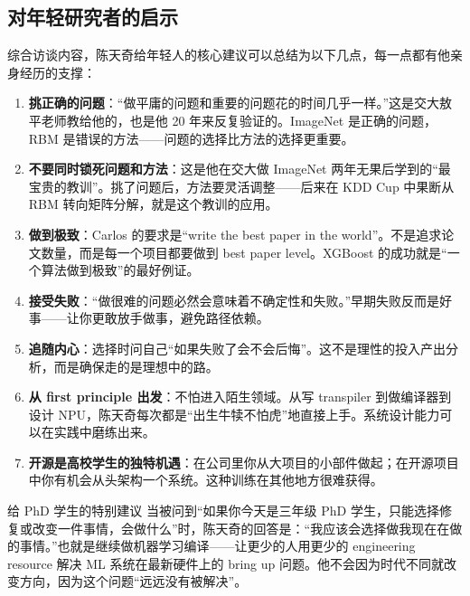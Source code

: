 \documentclass[a4paper]{article}
\begin{document}
\subsection{对年轻研究者的启示}

综合访谈内容，陈天奇给年轻人的核心建议可以总结为以下几点，每一点都有他亲身经历的支撑：

\begin{enumerate}
    \item \textbf{挑正确的问题}：``做平庸的问题和重要的问题花的时间几乎一样。''这是交大敖平老师教给他的，也是他 20 年来反复验证的。ImageNet 是正确的问题，RBM 是错误的方法------问题的选择比方法的选择更重要。

    \item \textbf{不要同时锁死问题和方法}：这是他在交大做 ImageNet 两年无果后学到的``最宝贵的教训''。挑了问题后，方法要灵活调整------后来在 KDD Cup 中果断从 RBM 转向矩阵分解，就是这个教训的应用。

    \item \textbf{做到极致}：Carlos 的要求是``write the best paper in the world''。不是追求论文数量，而是每一个项目都要做到 best paper level。XGBoost 的成功就是``一个算法做到极致''的最好例证。

    \item \textbf{接受失败}：``做很难的问题必然会意味着不确定性和失败。''早期失败反而是好事------让你更敢放手做事，避免路径依赖。

    \item \textbf{追随内心}：选择时问自己``如果失败了会不会后悔''。这不是理性的投入产出分析，而是确保走的是理想中的路。

    \item \textbf{从 first principle 出发}：不怕进入陌生领域。从写 transpiler 到做编译器到设计 NPU，陈天奇每次都是``出生牛犊不怕虎''地直接上手。系统设计能力可以在实践中磨练出来。

    \item \textbf{开源是高校学生的独特机遇}：在公司里你从大项目的小部件做起；在开源项目中你有机会从头架构一个系统。这种训练在其他地方很难获得。
\end{enumerate}

\begin{knowledgebox}{给 PhD 学生的特别建议}
当被问到``如果你今天是三年级 PhD 学生，只能选择修复或改变一件事情，会做什么''时，陈天奇的回答是：``我应该会选择做我现在在做的事情。''也就是继续做机器学习编译------让更少的人用更少的 engineering resource 解决 ML 系统在最新硬件上的 bring up 问题。他不会因为时代不同就改变方向，因为这个问题``远远没有被解决''。
\end{knowledgebox}
\end{document}
